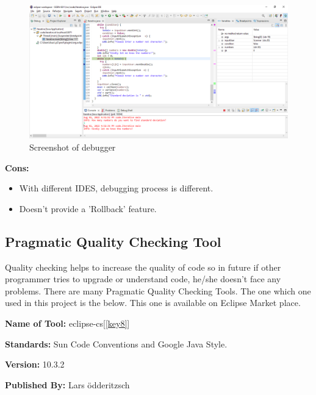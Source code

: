 \documentclass{scrartcl}
\begin{document}
\begin{figure}[H]
    \centering
    \includegraphics[width=1\textwidth]{Graphics/debug.png}
    \caption{Screenshot of debugger}
    \label{fig:debug}
\end{figure}

\begin{Large}
\vspace{0.5cm}
\textbf{Cons:}
\begin{itemize}
  \item With different IDES, debugging process is different.   
  \item Doesn't provide a 'Rollback' feature.
\end{itemize}
\end{Large}

\vspace{0.2cm}
\subsection{Pragmatic Quality Checking Tool}

\begin{spacing}{1.5}
\begin{Large}
Quality checking helps to increase the quality of code so in future if other programmer tries to upgrade or understand code, he/she doesn't face any problems. There are many Pragmatic Quality Checking Tools. The one which one used in this project is the below. This one is available on Eclipse Market place.

\textbf{Name of Tool:} eclipse-cs[\ref{key8}]

\textbf{Standards:} Sun Code Conventions and Google Java Style.

\textbf{Version:} 10.3.2

\textbf{Published By:} Lars ödderitzsch

\end{Large}
\end{spacing}
\end{document}
